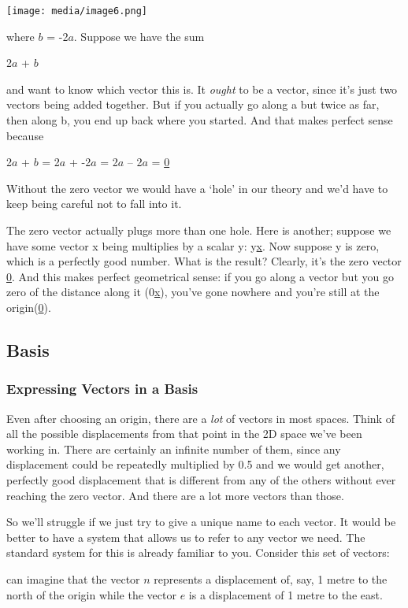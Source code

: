 \documentclass[oneside,english]{amsbook}
\numberwithin{section}{chapter}
\theoremstyle{plain}
\theoremstyle{definition}
\begin{document}
\texttt{[image: media/image6.png]}

where $b$ = -2$a$. Suppose we have the sum

2$a$ + $b$

and want to know which vector this is. It \emph{ought} to be a vector,
since it's just two vectors being added together. But if you actually go
along a but twice as far, then along b, you end up back where you
started. And that makes perfect sense because

2$a$ + $b$ = 2$a$ + -2$a$ = 2$a$ -- 2$a$ = \ul{0}

Without the zero vector we would have a `hole' in our theory and we'd
have to keep being careful not to fall into it.

The zero vector actually plugs more than one hole. Here is another;
suppose we have some vector x being multiplies by a scalar y: y\ul{x}.
Now suppose y is zero, which is a perfectly good number. What is the
result? Clearly, it's the zero vector \ul{0}. And this makes perfect
geometrical sense: if you go along a vector but you go zero of the
distance along it (0\ul{x}), you've gone nowhere and you're still at the
origin(\ul{0}).

\subsection{Basis}

\subsubsection{Expressing Vectors in a Basis}

Even after choosing an origin, there are a \emph{lot} of vectors in most
spaces. Think of all the possible displacements from that point in the
2D space we've been working in. There are certainly an infinite number
of them, since any displacement could be repeatedly multiplied by 0.5
and we would get another, perfectly good displacement that is different
from any of the others without ever reaching the zero vector. And there
are a lot more vectors than those.

So we'll struggle if we just try to give a unique name to each vector.
It would be better to have a system that allows us to refer to any
vector we need. The standard system for this is already familiar to you.
Consider this set of vectors:

can imagine that the vector $n$ represents a displacement of, say, 1
metre to the north of the origin while the vector $e$ is a
displacement of 1 metre to the east.
\end{document}

